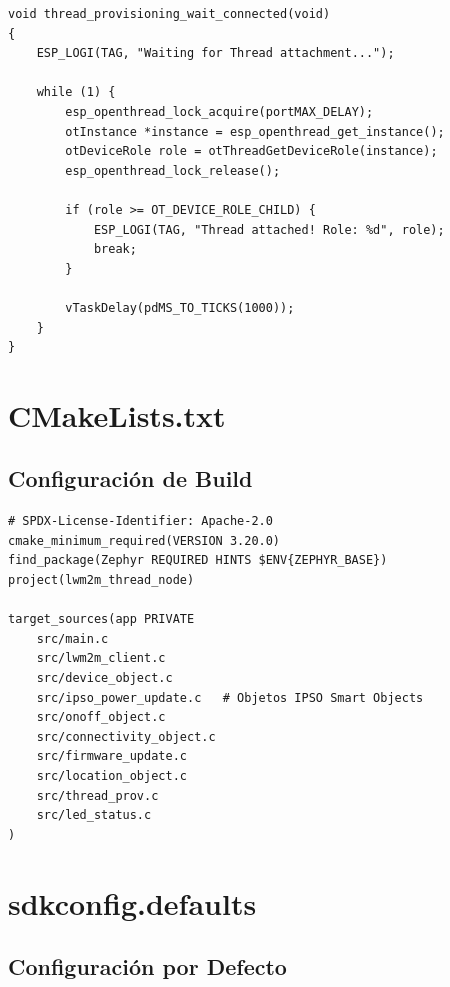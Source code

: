\begin{verbatim}
void thread_provisioning_wait_connected(void)
{
    ESP_LOGI(TAG, "Waiting for Thread attachment...");
    
    while (1) {
        esp_openthread_lock_acquire(portMAX_DELAY);
        otInstance *instance = esp_openthread_get_instance();
        otDeviceRole role = otThreadGetDeviceRole(instance);
        esp_openthread_lock_release();
        
        if (role >= OT_DEVICE_ROLE_CHILD) {
            ESP_LOGI(TAG, "Thread attached! Role: %d", role);
            break;
        }
        
        vTaskDelay(pdMS_TO_TICKS(1000));
    }
}
\end{verbatim}

\section{CMakeLists.txt}

\subsection{Configuración de Build}

\begin{verbatim}
# SPDX-License-Identifier: Apache-2.0
cmake_minimum_required(VERSION 3.20.0)
find_package(Zephyr REQUIRED HINTS $ENV{ZEPHYR_BASE})
project(lwm2m_thread_node)

target_sources(app PRIVATE
    src/main.c
    src/lwm2m_client.c
    src/device_object.c
    src/ipso_power_update.c   # Objetos IPSO Smart Objects
    src/onoff_object.c
    src/connectivity_object.c
    src/firmware_update.c
    src/location_object.c
    src/thread_prov.c
    src/led_status.c
)
\end{verbatim}

\section{sdkconfig.defaults}

\subsection{Configuración por Defecto}


